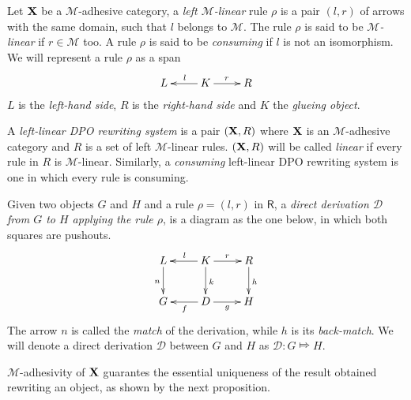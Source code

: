 \documentclass[a4paper,UKenglish,cleveref,pdftex, thm-restate,numberwithinsect]{lipics}
\def\R{\mathsf{R}}
\def\X{\textbf {\textup{X}}}
\newcommand{\dder}[1]{\mathscr{#1}}
\begin{document}
\begin{definition}
	Let $\X$ be a $\mathcal{M}$-adhesive category, a  \emph{left $\mathcal{M}$-linear} rule $\rho$ is a pair $(l,r)$ of arrows with the same domain, such that $l$ belongs to $\mathcal{M}$.  The rule $\rho$ is said to be \emph{$\mathcal{M}$-linear} if $r\in \mathcal{M}$ too. A rule $\rho$ is said to be \emph{consuming} if $l$ is not an isomorphism. We will represent a rule $\rho$ as a span 
	\[\xymatrix{L & K\ar[l]_{l} \ar[r]^{r} & R}\]
	$L$ is the \emph{left-hand side}, $R$ is the \emph{right-hand side} and $K$ the \emph{glueing object}. 
	
	
	A \emph{left-linear DPO rewriting system} is a pair $(\X, \R)$ where $\X$ is an $\mathcal{M}$-adhesive category and $R$ is a set of left $\mathcal{M}$-linear rules. $(\X, \R)$ will be called \emph{linear} if every rule in $R$ is $\mathcal{M}$-linear. Similarly, a \emph{consuming} left-linear DPO rewriting system is one in which every rule is consuming.
	
	Given  two objects $G$ and $H$ and a rule $\rho=(l,r)$ in $\R$, a \emph{direct derivation $\mathscr{D}$ from $G$ to $H$ applying the rule $\rho$}, is a diagram as the one below, in which both squares are pushouts. 
	\[\xymatrix{L \ar[d]_{n}& K \ar[d]^{k}\ar[l]_{l} \ar[r]^{r} & R \ar[d]^{h}\\G & \ar[l]^{f} D \ar[r]_{g}& H}\]
	The arrow $n$ is called the \emph{match} of the derivation, while $h$ is its \emph{back-match}.
	We will denote a direct derivation $\dder{D}$ between $G$ and $H$ as $\dder{D}\colon G\Mapsto H$. 
\end{definition}


$\mathcal{M}$-adhesivity of $\X$ guarantes the essential uniqueness of the result obtained rewriting an object, as shown by the next proposition.
\end{document}
